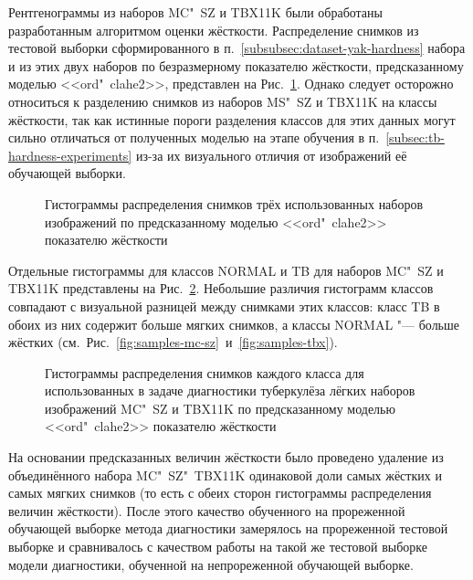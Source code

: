 Рентгенограммы из наборов MC"~SZ и TBX11K были обработаны разработанным алгоритмом оценки жёсткости. Распределение снимков из тестовой выборки сформированного в п.~\ref{subsubsec:dataset-yak-hardness} набора и из этих двух наборов по безразмерному показателю жёсткости, предсказанному моделью <<ord"~clahe2>>, представлен на Рис.~\ref{fig:ordinal-hist-total}. Однако следует осторожно относиться к разделению снимков из наборов MS"~SZ и TBX11K на классы жёсткости, так как истинные пороги разделения классов для этих данных могут сильно отличаться от полученных моделью на этапе обучения в п.~\ref{subsec:tb-hardness-experiments} из-за их визуального отличия от изображений её обучающей выборки.

\begin{figure}[ht]
	\caption{Гистограммы распределения снимков трёх использованных наборов изображений по предсказанному моделью <<ord"~clahe2>> показателю жёсткости}
	\label{fig:ordinal-hist-total}
\end{figure}

Отдельные гистограммы для классов NORMAL и TB для наборов MC"~SZ и TBX11K представлены на Рис.~\ref{fig:ordinal-hist-datasetwise}. Небольшие различия гистограмм классов совпадают с визуальной разницей между снимками этих классов: класс TB в обоих из них содержит больше мягких снимков, а классы NORMAL "--- больше жёстких (см.~Рис.~\ref{fig:samples-mc-sz}~и~\ref{fig:samples-tbx}).

\begin{figure}[ht]
	\caption{Гистограммы распределения снимков каждого класса для использованных в задаче диагностики туберкулёза лёгких наборов изображений MC"~SZ и TBX11K по предсказанному моделью <<ord"~clahe2>> показателю жёсткости}
	\label{fig:ordinal-hist-datasetwise}
\end{figure}

На основании предсказанных величин жёсткости было проведено удаление из объединённого набора MC"~SZ"~TBX11K одинаковой доли самых жёстких и самых мягких снимков (то есть с обеих сторон гистограммы распределения величин жёсткости). После этого качество обученного на прореженной обучающей выборке метода диагностики замерялось на прореженной тестовой выборке и сравнивалось с качеством работы на такой же тестовой выборке модели диагностики, обученной на непрореженной обучающей выборке.

